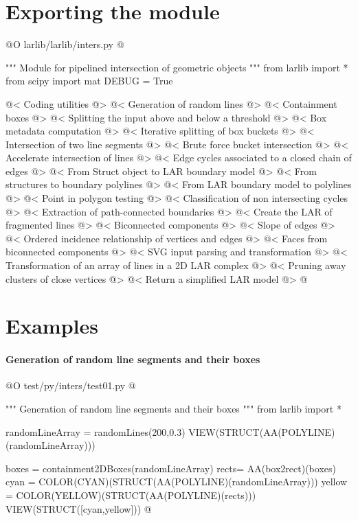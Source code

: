 \documentclass[11pt,oneside]{article}    %
\begin{document}
\section{Exporting the module}

@O larlib/larlib/inters.py
@{""" Module for pipelined intersection of geometric objects """
from larlib import *
from scipy import mat
DEBUG = True

@< Coding utilities @>
@< Generation of random lines @>
@< Containment boxes @>
@< Splitting the input above and below a threshold @>
@< Box metadata computation @>
@< Iterative splitting of box buckets @>
@< Intersection of two line segments @>
@< Brute force bucket intersection @>
@< Accelerate intersection of lines @>
@< Edge cycles associated to a closed chain of edges @>
@< From Struct object to LAR boundary model @>
@< From structures to boundary polylines @>
@< From LAR boundary model to polylines @>
@< Point in polygon testing @>
@< Classification of non intersecting cycles @>
@< Extraction of path-connected boundaries @>
@< Create the LAR of fragmented lines @>
@< Biconnected components @>
@< Slope of edges @>
@< Ordered incidence relationship of vertices and edges @>
@< Faces from biconnected components @>
@< SVG input parsing and transformation @>
@< Transformation of an array of lines in a 2D LAR complex @>
@< Pruning away clusters of close vertices @>
@< Return a simplified LAR model @>
@}


\section{Examples}




\paragraph{Generation of random line segments and their boxes}
@O test/py/inters/test01.py
@{""" Generation of random line segments and their boxes """
from larlib import *

randomLineArray = randomLines(200,0.3)
VIEW(STRUCT(AA(POLYLINE)(randomLineArray)))

boxes = containment2DBoxes(randomLineArray)
rects= AA(box2rect)(boxes)
cyan = COLOR(CYAN)(STRUCT(AA(POLYLINE)(randomLineArray)))
yellow = COLOR(YELLOW)(STRUCT(AA(POLYLINE)(rects)))
VIEW(STRUCT([cyan,yellow]))
@}
\end{document}
